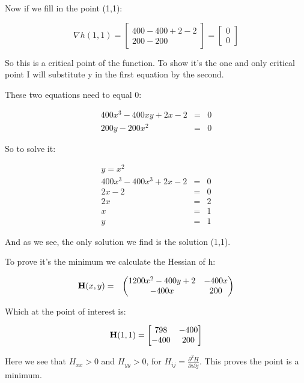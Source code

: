 \documentclass[a4paper]{article}
\begin{document}
Now if we fill in the point (1,1):

\begin{equation}
\nabla h(1,1) = \begin{bmatrix}
400-400+2-2\\
200-200
\end{bmatrix} = \begin{bmatrix}
0\\
0
\end{bmatrix}
\end{equation}

So this is a critical point of the function. To show it's the one and only critical point I will substitute y in the first equation by the second.

These two equations need to equal 0:

\begin{eqnarray}
400x^3-400xy+2x-2 &=& 0\\
200y-200x^2 &=& 0
\end{eqnarray}

So to solve it:

\begin{eqnarray}
y = x^2\\
400x^3 -400x^3 + 2x - 2 &=& 0\\
2x-2 &=& 0\\
2x &=& 2\\
x &=& 1\\
y &=& 1
\end{eqnarray}

And as we see, the only solution we find is the solution (1,1).

To prove it's the minimum we calculate the Hessian of h:

\begin{eqnarray}
\bold H(x,y) &=& \begin{pmatrix}
1200x^2 - 400y + 2 & -400x\\
-400x & 200
\end{pmatrix}
\end{eqnarray}

Which at the point of interest is:

\begin{equation}
\bold H(1,1) = \begin{bmatrix}
798 & -400\\
-400 & 200
\end{bmatrix}
\end{equation}

Here we see that $H_{xx} > 0$ and $H_{yy} > 0$, for $H_{ij} = \frac{\partial^2 H}{\partial i \partial j}$. This proves the point is a minimum.
\end{document}
